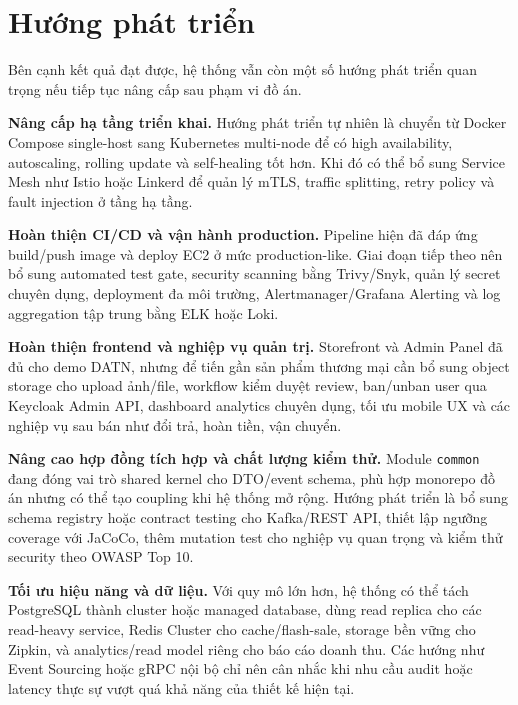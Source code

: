 \documentclass[../DoAn.tex]{subfiles}
\begin{document}
\section*{Hướng phát triển}

Bên cạnh kết quả đạt được, hệ thống vẫn còn một số hướng phát triển quan trọng nếu tiếp tục
nâng cấp sau phạm vi đồ án.

\textbf{Nâng cấp hạ tầng triển khai.} Hướng phát triển tự nhiên là chuyển từ Docker Compose
single-host sang Kubernetes multi-node để có high availability, autoscaling, rolling update
và self-healing tốt hơn. Khi đó có thể bổ sung Service Mesh như Istio hoặc Linkerd để quản lý
mTLS, traffic splitting, retry policy và fault injection ở tầng hạ tầng.

\textbf{Hoàn thiện CI/CD và vận hành production.} Pipeline hiện đã đáp ứng build/push image
và deploy EC2 ở mức production-like. Giai đoạn tiếp theo nên bổ sung automated test gate,
security scanning bằng Trivy/Snyk, quản lý secret chuyên dụng, deployment đa môi trường,
Alertmanager/Grafana Alerting và log aggregation tập trung bằng ELK hoặc Loki.

\textbf{Hoàn thiện frontend và nghiệp vụ quản trị.} Storefront và Admin Panel đã đủ cho demo
DATN, nhưng để tiến gần sản phẩm thương mại cần bổ sung object storage cho upload ảnh/file,
workflow kiểm duyệt review, ban/unban user qua Keycloak Admin API, dashboard analytics chuyên
dụng, tối ưu mobile UX và các nghiệp vụ sau bán như đổi trả, hoàn tiền, vận chuyển.

\textbf{Nâng cao hợp đồng tích hợp và chất lượng kiểm thử.} Module \texttt{common} đang đóng
vai trò shared kernel cho DTO/event schema, phù hợp monorepo đồ án nhưng có thể tạo coupling
khi hệ thống mở rộng. Hướng phát triển là bổ sung schema registry hoặc contract testing cho
Kafka/REST API, thiết lập ngưỡng coverage với JaCoCo, thêm mutation test cho nghiệp vụ quan
trọng và kiểm thử security theo OWASP Top 10.

\textbf{Tối ưu hiệu năng và dữ liệu.} Với quy mô lớn hơn, hệ thống có thể tách PostgreSQL
thành cluster hoặc managed database, dùng read replica cho các read-heavy service, Redis
Cluster cho cache/flash-sale, storage bền vững cho Zipkin, và analytics/read model riêng cho
báo cáo doanh thu. Các hướng như Event Sourcing hoặc gRPC nội bộ chỉ nên cân nhắc khi nhu cầu
audit hoặc latency thực sự vượt quá khả năng của thiết kế hiện tại.
\end{document}
